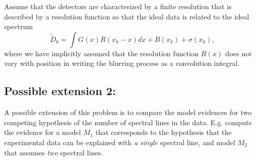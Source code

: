 \documentclass{article}
\begin{document}
Assume that the detectors are characterized by a finite resolution that
is described by a resolution function so that the ideal data is related
to the ideal spectrum
\[ \tilde{D}_k = \int G(x) R(x_k - x) dx + B(x_k) + \sigma(x_k),\] where
we have implicitly assumed that the resolution function \(R(x)\) does
not vary with position in writing the blurring process as a convolution
integral.

\subsection*{Possible extension 2:}\label{extension-2}

A possible extension of this problem is to compare the model evidences
for two competing hypothesis of the number of spectral lines in the
data. E.g. compute the evidence for a model \(M_1\) that corresponds to
the hypothesis that the experimental data can be explained with \emph{a
single} spectral line, and model \(M_2\) that assumes \emph{two}
spectral lines.

    
    
    
    
\end{document}
